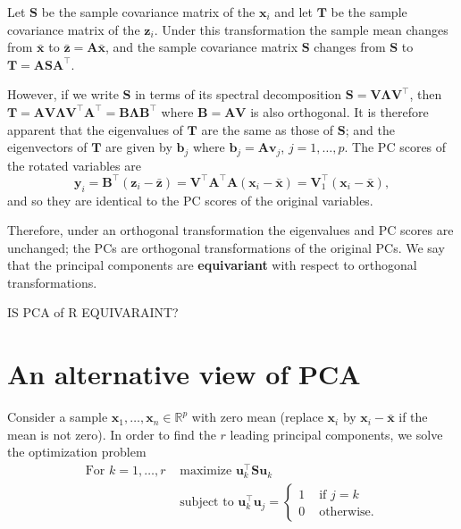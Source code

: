 \documentclass[]{book}
\theoremstyle{definition}
\theoremstyle{definition}
\theoremstyle{definition}
\theoremstyle{remark}
\begin{document}
Let \(\boldsymbol S\) be the sample covariance matrix of the \(\boldsymbol x_i\) and let \(\boldsymbol T\) be the sample covariance matrix of the \(\boldsymbol z_i\). Under this transformation the sample mean changes from \(\bar{\boldsymbol x}\) to \(\bar{\boldsymbol z} = \boldsymbol A\bar{\boldsymbol x}\), and the sample covariance matrix \(\boldsymbol S\) changes from \(\boldsymbol S\) to \(\boldsymbol T= \boldsymbol A\boldsymbol S\boldsymbol A^\top\).

However, if we write \(\boldsymbol S\) in terms of its spectral decomposition \(\boldsymbol S= \boldsymbol V\boldsymbol \Lambda\boldsymbol V^\top\), then \(\boldsymbol T= \boldsymbol A\boldsymbol V\boldsymbol \Lambda\boldsymbol V^\top \boldsymbol A^\top = \boldsymbol B\boldsymbol \Lambda\boldsymbol B^\top\) where \(\boldsymbol B= \boldsymbol A\boldsymbol V\) is also orthogonal. It is therefore apparent that the eigenvalues of \(\boldsymbol T\) are the same as those of \(\boldsymbol S\); and the eigenvectors of \(\boldsymbol T\) are given by \(\boldsymbol b_j\) where \(\boldsymbol b_j = \boldsymbol A\boldsymbol v_j\), \(j=1,\ldots,p\). The PC scores of the rotated variables are
\[ \boldsymbol y_i = \boldsymbol B^\top (\boldsymbol z_i - \bar{\boldsymbol z}) = \boldsymbol V^\top \boldsymbol A^\top \boldsymbol A(\boldsymbol x_i - \bar{\boldsymbol x}) = \boldsymbol V_1^\top (\boldsymbol x_i - \bar{\boldsymbol x}),\]
and so they are identical to the PC scores of the original variables.

Therefore, under an orthogonal transformation the eigenvalues and PC scores are unchanged; the PCs are orthogonal transformations of the original PCs. We say that the principal components are \textbf{equivariant} with respect to orthogonal transformations.

IS PCA of R EQUIVARAINT?

\hypertarget{an-alternative-view-of-pca}{%
\section{An alternative view of PCA}\label{an-alternative-view-of-pca}}

Consider a sample \(\boldsymbol x_1, \ldots , \boldsymbol x_n \in \mathbb{R}^p\) with zero mean (replace \(\boldsymbol x_i\) by \(\boldsymbol x_i-\bar{\boldsymbol x}\) if the mean is not zero). In order to find the \(r\) leading principal components, we solve the optimization problem
\begin{align*}
\mbox{For } k=1, \ldots, r &\mbox{ maximize } \boldsymbol u_k^\top \boldsymbol S\boldsymbol u_k \\
 &\mbox{ subject to } \boldsymbol u_k^\top \boldsymbol u_j = \begin{cases}
 1  &\mbox{ if } j=k\\
 0 & \mbox{ otherwise.}
 \end{cases}
 \end{align*}
\end{document}
